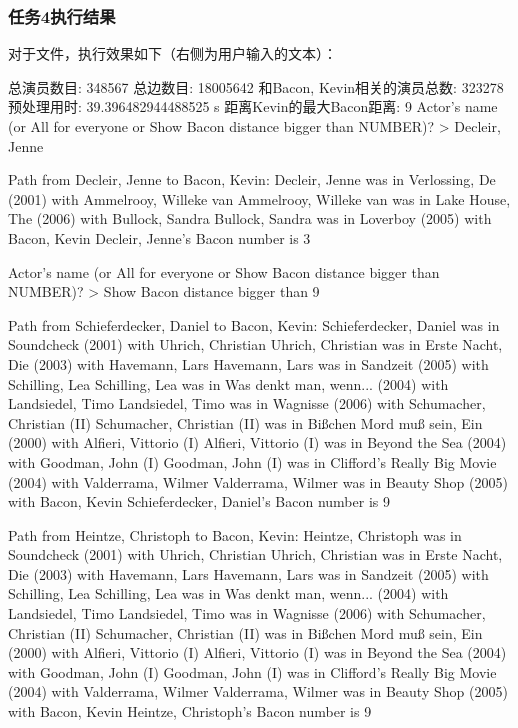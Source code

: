 \documentclass[12pt, a4paper, oneside]{ctexart}
\numberwithin{equation}{section}  %
\begin{document}
\subsubsection{任务4执行结果}
对于文件，执行效果如下（\pythoninline{> }右侧为用户输入的文本）：
\begin{pythoncode}
总演员数目: 348567
总边数目: 18005642
和Bacon, Kevin相关的演员总数: 323278
预处理用时: 39.396482944488525 s
距离Kevin的最大Bacon距离: 9
Actor's name (or All for everyone or Show Bacon distance bigger than NUMBER)?
> Decleir, Jenne

Path from Decleir, Jenne to Bacon, Kevin:
Decleir, Jenne was in Verlossing, De (2001) with Ammelrooy, Willeke van
Ammelrooy, Willeke van was in Lake House, The (2006) with Bullock, Sandra
Bullock, Sandra was in Loverboy (2005) with Bacon, Kevin
Decleir, Jenne's Bacon number is 3

Actor's name (or All for everyone or Show Bacon distance bigger than NUMBER)?
> Show Bacon distance bigger than 9     

Path from Schieferdecker, Daniel to Bacon, Kevin:
Schieferdecker, Daniel was in Soundcheck (2001) with Uhrich, Christian
Uhrich, Christian was in Erste Nacht, Die (2003) with Havemann, Lars
Havemann, Lars was in Sandzeit (2005) with Schilling, Lea
Schilling, Lea was in Was denkt man, wenn... (2004) with Landsiedel, Timo
Landsiedel, Timo was in Wagnisse (2006) with Schumacher, Christian (II)
Schumacher, Christian (II) was in Bißchen Mord muß sein, Ein (2000) with Alfieri, Vittorio (I)
Alfieri, Vittorio (I) was in Beyond the Sea (2004) with Goodman, John (I)
Goodman, John (I) was in Clifford's Really Big Movie (2004) with Valderrama, Wilmer
Valderrama, Wilmer was in Beauty Shop (2005) with Bacon, Kevin
Schieferdecker, Daniel's Bacon number is 9


Path from Heintze, Christoph to Bacon, Kevin:
Heintze, Christoph was in Soundcheck (2001) with Uhrich, Christian
Uhrich, Christian was in Erste Nacht, Die (2003) with Havemann, Lars
Havemann, Lars was in Sandzeit (2005) with Schilling, Lea
Schilling, Lea was in Was denkt man, wenn... (2004) with Landsiedel, Timo
Landsiedel, Timo was in Wagnisse (2006) with Schumacher, Christian (II)
Schumacher, Christian (II) was in Bißchen Mord muß sein, Ein (2000) with Alfieri, Vittorio (I)
Alfieri, Vittorio (I) was in Beyond the Sea (2004) with Goodman, John (I)
Goodman, John (I) was in Clifford's Really Big Movie (2004) with Valderrama, Wilmer
Valderrama, Wilmer was in Beauty Shop (2005) with Bacon, Kevin
Heintze, Christoph's Bacon number is 9



\end{pythoncode}
\end{document}
